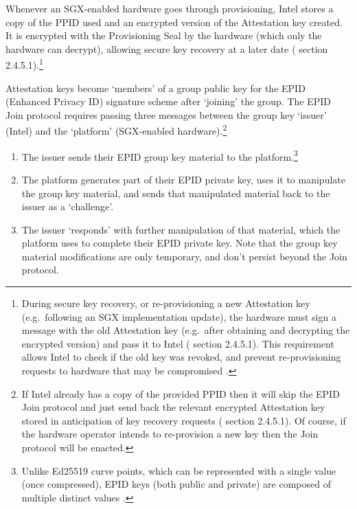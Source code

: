 Whenever an SGX-enabled hardware goes through provisioning, Intel stores a copy of the PPID used and an encrypted version of the Attestation key created. It is encrypted with the Provisioning Seal by the hardware (which only the hardware can decrypt), allowing secure key recovery at a later date (\cite{sgx-extending-sgx-autonomy-and-anonymity-thesis} section 2.4.5.1).\footnote{During secure key recovery, or re-provisioning a new Attestation key (e.g.\ following an SGX implementation update), the hardware must sign a message with the old Attestation key (e.g.\ after obtaining and decrypting the encrypted version) and pass it to Intel (\cite{sgx-extending-sgx-autonomy-and-anonymity-thesis} section 2.4.5.1). This requirement allows Intel to check if the old key was revoked, and prevent re-provisioning requests to hardware that may be compromised \cite{sgx-epid-provisioning-attestation}.}

Attestation keys become `members' of a group public key for the EPID (Enhanced Privacy ID) signature scheme  \cite{epid-paper} after `joining' the group. The EPID Join protocol \cite{epid-paper} requires passing three messages between the group key `issuer' (Intel) and the `platform' (SGX-enabled hardware).\footnote{If Intel already has a copy of the provided PPID then it will skip the EPID Join protocol and just send back the relevant encrypted Attestation key stored in anticipation of key recovery requests (\cite{sgx-extending-sgx-autonomy-and-anonymity-thesis} section 2.4.5.1). Of course, if the hardware operator intends to re-provision a new key then the Join protocol will be enacted.}
\begin{enumerate}
    \item The issuer sends their EPID group key material to the platform.\footnote{Unlike Ed25519 curve points, which can be represented with a single value (once compressed), EPID keys (both public and private) are composed of multiple distinct values \cite{epid-paper}.}
    \item The platform generates part of their EPID private key, uses it to manipulate the group key material, and sends that manipulated material back to the issuer as a `challenge'.
    \item The issuer `responds' with further manipulation of that material, which the platform uses to complete their EPID private key. Note that the group key material modifications are only temporary, and don't persist beyond the Join protocol.
\end{enumerate}


